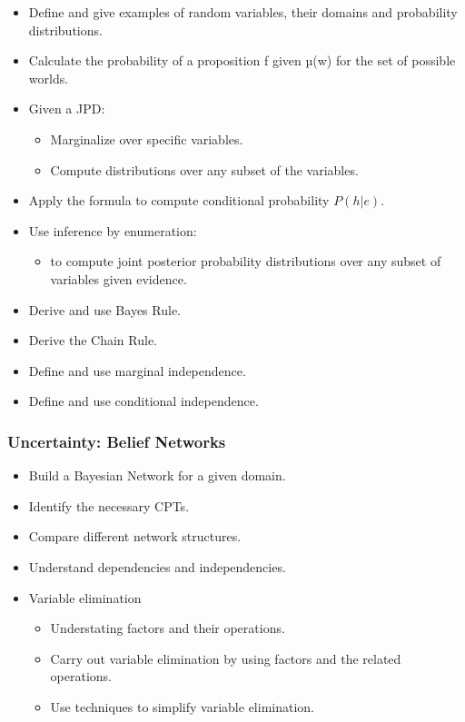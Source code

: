 \documentclass{article}
\begin{document}
\begin{itemize}
    \item Define and give examples of random variables, their domains and probability distributions.
    \item Calculate the probability of a proposition f given µ(w) for the set of possible worlds.
    \item Given a JPD:
        \begin{itemize}
            \item Marginalize over specific variables.
            \item Compute distributions over any subset of the variables.
        \end{itemize}
    \item Apply the formula to compute conditional probability $P(h|e)$.
    \item Use inference by enumeration:
        \begin{itemize}
            \item to compute joint posterior probability distributions over any subset of variables given evidence.
        \end{itemize}
    \item Derive and use Bayes Rule.
    \item Derive the Chain Rule.
    \item Define and use marginal independence.
    \item Define and use conditional independence.
\end{itemize}

\subsubsection*{Uncertainty: Belief Networks}

\begin{itemize}
    \item Build a Bayesian Network for a given domain.
    \item Identify the necessary CPTs.
    \item Compare different network structures.
    \item Understand dependencies and independencies.
    \item Variable elimination
        \begin{itemize}
            \item Understating factors and their operations.
            \item Carry out variable elimination by using factors and the related operations.
            \item Use techniques to simplify variable elimination.
        \end{itemize}
\end{itemize}
\end{document}
